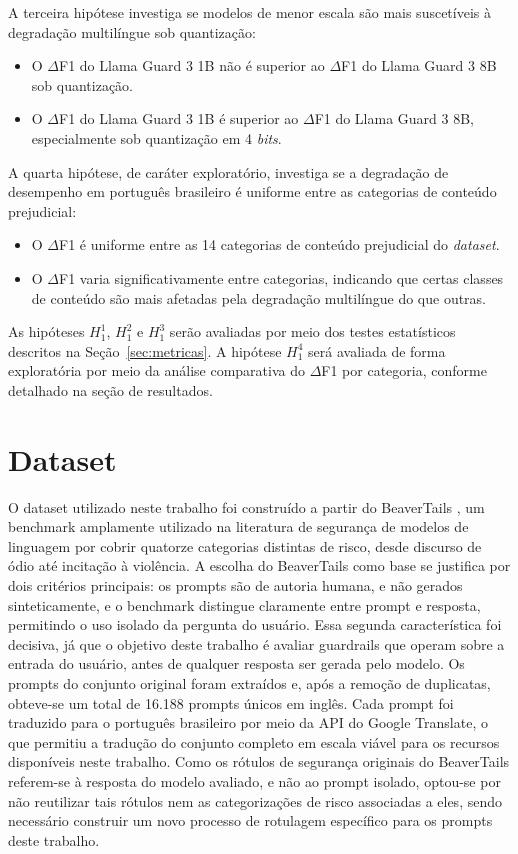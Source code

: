 A terceira hipótese investiga se modelos de menor escala são mais suscetíveis à degradação multilíngue sob quantização:

\begin{itemize}
	\item[$H_0^3$:] O $\Delta$F1 do Llama Guard 3 1B não é superior ao $\Delta$F1 do Llama Guard 3 8B sob quantização.
	\item[$H_1^3$:] O $\Delta$F1 do Llama Guard 3 1B é superior ao $\Delta$F1 do Llama Guard 3 8B, especialmente sob quantização em 4 \textit{bits}.
\end{itemize}

A quarta hipótese, de caráter exploratório, investiga se a degradação de desempenho em português brasileiro é uniforme entre as categorias de conteúdo prejudicial:

\begin{itemize}
	\item[$H_0^4$:] O $\Delta$F1 é uniforme entre as 14 categorias de conteúdo prejudicial do \textit{dataset}.
	\item[$H_1^4$:] O $\Delta$F1 varia significativamente entre categorias, indicando que certas classes de conteúdo são mais afetadas pela degradação multilíngue do que outras.
\end{itemize}

As hipóteses $H_1^1$, $H_1^2$ e $H_1^3$ serão avaliadas por meio dos testes estatísticos descritos na Seção~\ref{sec:metricas}. A hipótese $H_1^4$ será avaliada de forma exploratória por meio da análise comparativa do $\Delta$F1 por categoria, conforme detalhado na seção de resultados.

\section{Dataset}
\label{sec:dataset}

O dataset utilizado neste trabalho foi construído a partir do BeaverTails \cite{ji2023beavertails}, um benchmark amplamente utilizado na literatura de segurança de modelos de linguagem por cobrir quatorze categorias distintas de risco, desde discurso de ódio até incitação à violência. A escolha do BeaverTails como base se justifica por dois critérios principais: os prompts são de autoria humana, e não gerados sinteticamente, e o benchmark distingue claramente entre prompt e resposta, permitindo o uso isolado da pergunta do usuário. Essa segunda característica foi decisiva, já que o objetivo deste trabalho é avaliar guardrails que operam sobre a entrada do usuário, antes de qualquer resposta ser gerada pelo modelo. Os prompts do conjunto original foram extraídos e, após a remoção de duplicatas, obteve-se um total de 16.188 prompts únicos em inglês. Cada prompt foi traduzido para o português brasileiro por meio da API do Google Translate, o que permitiu a tradução do conjunto completo em escala viável para os recursos disponíveis neste trabalho.
Como os rótulos de segurança originais do BeaverTails referem-se à resposta do modelo avaliado, e não ao prompt isolado, optou-se por não reutilizar tais rótulos nem as categorizações de risco associadas a eles, sendo necessário construir um novo processo de rotulagem específico para os prompts deste trabalho.

